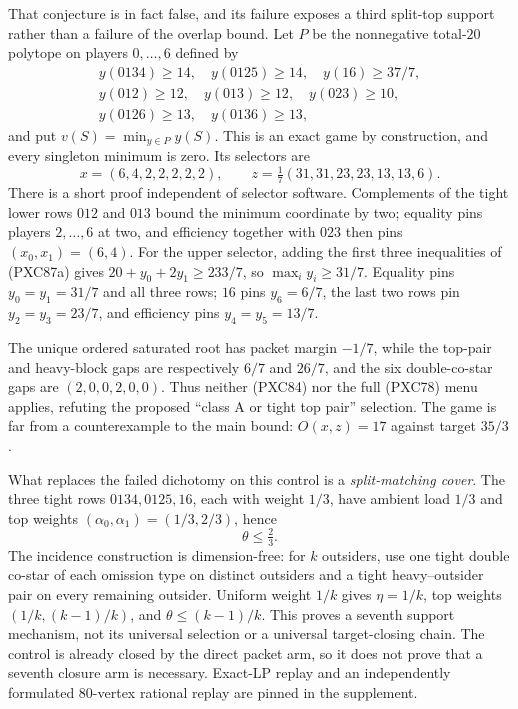 \documentclass[11pt]{article}
\begin{document}
That conjecture is in fact false, and its failure exposes a third split-top
support rather than a failure of the overlap bound.  Let \(P\) be the
nonnegative total-\(20\) polytope on players \(0,\ldots,6\) defined by
\[
\begin{gathered}
 y(0134)\ge14,\quad y(0125)\ge14,\quad y(16)\ge37/7,\\
 y(012)\ge12,\quad y(013)\ge12,\quad y(023)\ge10,\\
 y(0126)\ge13,\quad y(0136)\ge13,
\end{gathered}                                      \tag{PXC87a}
\]
and put \(v(S)=\min_{y\in P}y(S)\).  This is an exact game by construction,
and every singleton minimum is zero.  Its selectors are
\[
 x=(6,4,2,2,2,2,2),\qquad
 z=\tfrac17(31,31,23,23,13,13,6).                  \tag{PXC87b}
\]
There is a short proof independent of selector software.  Complements of
the tight lower rows \(012\) and \(013\) bound the minimum coordinate by two;
equality pins players \(2,\ldots,6\) at two, and efficiency together with
\(023\) then pins \((x_0,x_1)=(6,4)\).  For the upper selector, adding the
first three inequalities of (PXC87a) gives
\(20+y_0+2y_1\ge233/7\), so \(\max_i y_i\ge31/7\).
Equality pins \(y_0=y_1=31/7\) and all three rows; \(16\) pins \(y_6=6/7\),
the last two rows pin \(y_2=y_3=23/7\), and efficiency pins
\(y_4=y_5=13/7\).

The unique ordered saturated root has packet margin \(-1/7\), while the
top-pair and heavy-block gaps are respectively \(6/7\) and \(26/7\), and the
six double-co-star gaps are \((2,0,0,2,0,0)\).  Thus neither (PXC84) nor the
full (PXC78) menu applies, refuting the proposed ``class A or tight top pair''
selection.  The game is far from a counterexample to the main bound:
\(O(x,z)=17\) against target \(35/3\).

What replaces the failed dichotomy on this control is a
\emph{split-matching cover}.  The three tight rows \(0134,0125,16\), each
with weight \(1/3\), have ambient load \(1/3\) and top weights
\((\alpha_0,\alpha_1)=(1/3,2/3)\), hence
\[
 \theta\le\tfrac23.                                  \tag{PXC87}
\]
The incidence construction is dimension-free: for \(k\) outsiders, use one
tight double co-star of each omission type on distinct outsiders and a tight
heavy--outsider pair on every remaining outsider.  Uniform weight \(1/k\)
gives \(\eta=1/k\), top weights \((1/k,(k-1)/k)\), and
\(\theta\le(k-1)/k\).  This proves a seventh support mechanism, not its
universal selection or a universal target-closing chain.  The control is
already closed by the direct packet arm, so it does not prove that a seventh
closure arm is necessary.  Exact-LP replay and an independently formulated
\(80\)-vertex rational replay are pinned in the supplement.
\end{document}
